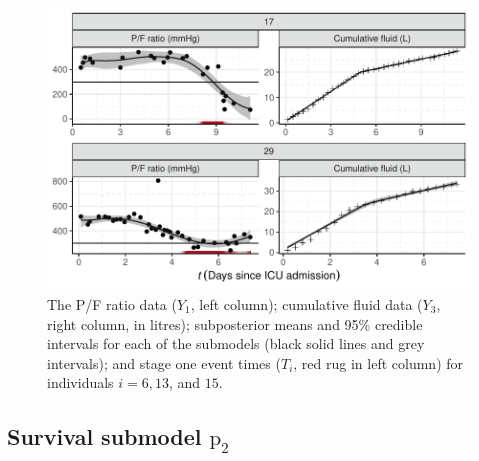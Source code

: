 \documentclass[
  10pt,
  a4paper,
]{article}
\newcommand{\pd}{\text{p}}
\begin{document}
\begin{figure}

{\centering \includegraphics{../plots/mimic-example/combined-pf-fluid-fit-plot-small} 

}

\caption{The P/F ratio data ($Y_{1}$, left column); cumulative fluid data ($Y_{3}$, right column, in litres); subposterior means and 95\% credible intervals for each of the submodels (black solid lines and grey intervals); and stage one event times ($T_{i}$, red rug in left column) for individuals $i = 6, 13$, and $15$.}\label{fig:pf_fit_and_fluid_fit_plot}
\end{figure}

\hypertarget{survival-submodel-pd_2}{%
\subsection{\texorpdfstring{Survival submodel
\(\pd_{2}\)}{Survival submodel \textbackslash pd\_\{2\}}}\label{survival-submodel-pd_2}}
\end{document}
